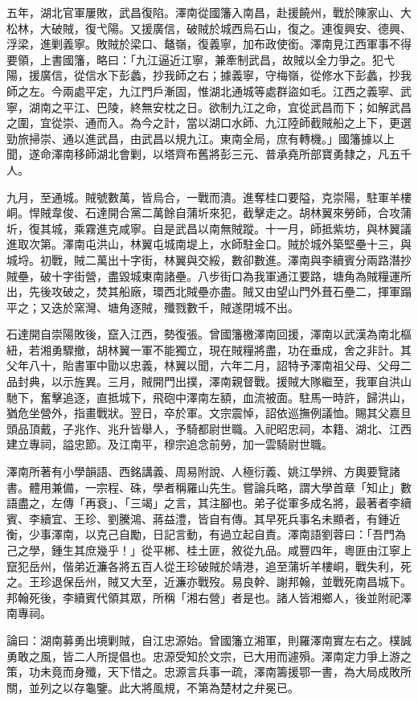 \begin{pinyinscope}
五年，湖北官軍屢敗，武昌復陷。澤南從國籓入南昌，赴援饒州，戰於陳家山、大松林，大破賊，復弋陽。又援廣信，破賊於城西烏石山，復之。連復興安、德興、浮梁，進剿義寧。敗賊於梁口、鼇嶺，復義寧，加布政使銜。澤南見江西軍事不得要領，上書國籓，略曰：「九江逼近江寧，兼牽制武昌，故賊以全力爭之。犯弋陽，援廣信，從信水下彭蠡，抄我師之右；據義寧，守梅嶺，從修水下彭蠡，抄我師之左。今兩處平定，九江門戶漸固，惟湖北通城等處群盜如毛。江西之義寧、武寧，湖南之平江、巴陵，終無安枕之日。欲制九江之命，宜從武昌而下；如解武昌之圍，宜從崇、通而入。為今之計，當以湖口水師、九江陸師截賊船之上下，更選勁旅掃崇、通以進武昌，由武昌以規九江。東南全局，庶有轉機。」國籓據以上聞，遂命澤南移師湖北會剿，以塔齊布舊將彭三元、普承堯所部寶勇隸之，凡五千人。

九月，至通城。賊號數萬，皆烏合，一戰而潰。進奪桂口要隘，克崇陽，駐軍羊樓峒。悍賊韋俊、石達開合黨二萬餘自蒲圻來犯，截擊走之。胡林翼來勞師，合攻蒲圻，復其城，乘霧進克咸寧。自是武昌以南無賊蹤。十一月，師抵紫坊，與林翼議進取次第。澤南屯洪山，林翼屯城南堤上，水師駐金口。賊於城外築堅壘十三，與城埒。初戰，賊二萬出十字街，林翼與交綏，數卻數進。澤南與李續賓分兩路潛抄賊壘，破十字街營，盡毀城東南諸壘。八步街口為我軍通江要路，塘角為賊糧運所出，先後攻破之，焚其船廠，環西北賊壘亦盡。賊又由望山門外葺石壘二，揮軍蹋平之；又迭於窯灣、塘角逐賊，殲戮數千，賊遂閉城不出。

石達開自崇陽敗後，竄入江西，勢復張。曾國籓檄澤南回援，澤南以武漢為南北樞紐，若湘勇驟撤，胡林翼一軍不能獨立，現在賊糧將盡，功在垂成，舍之非計。其父年八十，貽書軍中勖以忠義，林翼以聞，六年二月，詔特予澤南祖父母、父母二品封典，以示旌異。三月，賊開門出撲，澤南親督戰。援賊大隊繼至，我軍自洪山馳下，奮擊追逐，直抵城下，飛砲中澤南左額，血流被面。駐馬一時許，歸洪山，猶危坐營外，指畫戰狀。翌日，卒於軍。文宗震悼，詔依巡撫例議恤。賜其父嘉旦頭品頂戴，子兆作、兆升皆舉人，予騎都尉世職。入祀昭忠祠，本籍、湖北、江西建立專祠，謚忠節。及江南平，穆宗追念前勞，加一雲騎尉世職。

澤南所著有小學韻語、西銘講義、周易附說、人極衍義、姚江學辨、方輿要覽諸書。體用兼備，一宗程、硃，學者稱羅山先生。嘗論兵略，謂大學首章「知止」數語盡之，左傳「再衰」、「三竭」之言，其注腳也。弟子從軍多成名將，最著者李續賓、李續宜、王珍、劉騰鴻、蔣益澧，皆自有傳。其早死兵事名未顯者，有鍾近衡，少事澤南，以克己自勵，日記言動，有過立起自責。澤南語劉蓉曰：「吾門為己之學，鍾生其庶幾乎！」從平郴、桂土匪，敘從九品。咸豐四年，粵匪由江寧上竄犯岳州，偕弟近濂各將五百人從王珍破賊於靖港，追至蒲圻羊樓峒，戰失利，死之。王珍退保岳州，賊又大至，近濂亦戰歿。易良幹、謝邦翰，並戰死南昌城下。邦翰死後，李續賓代領其眾，所稱「湘右營」者是也。諸人皆湘鄉人，後並附祀澤南專祠。

論曰：湖南募勇出境剿賊，自江忠源始。曾國籓立湘軍，則羅澤南實左右之。樸誠勇敢之風，皆二人所提倡也。忠源受知於文宗，已大用而遽殞。澤南定力爭上游之策，功未竟而身殲，天下惜之。忠源言兵事一疏，澤南籌援鄂一書，為大局成敗所關，並列之以存龜鑒。此大將風規，不第為楚材之弁冕已。


\end{pinyinscope}